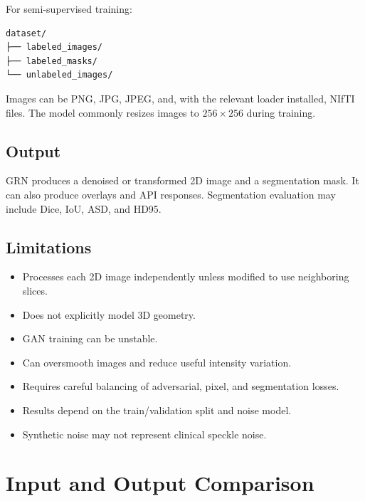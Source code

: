 \documentclass[11pt,a4paper]{article}
\begin{document}
For semi-supervised training:
\begin{verbatim}
dataset/
├── labeled_images/
├── labeled_masks/
└── unlabeled_images/
\end{verbatim}

Images can be PNG, JPG, JPEG, and, with the relevant loader installed, NIfTI files. The model commonly resizes images to $256\times256$ during training.

\subsection{Output}
GRN produces a denoised or transformed 2D image and a segmentation mask. It can also produce overlays and API responses. Segmentation evaluation may include Dice, IoU, ASD, and HD95.

\subsection{Limitations}
\begin{itemize}
    \item Processes each 2D image independently unless modified to use neighboring slices.
    \item Does not explicitly model 3D geometry.
    \item GAN training can be unstable.
    \item Can oversmooth images and reduce useful intensity variation.
    \item Requires careful balancing of adversarial, pixel, and segmentation losses.
    \item Results depend on the train/validation split and noise model.
    \item Synthetic noise may not represent clinical speckle noise.
\end{itemize}

\section{Input and Output Comparison}
\end{document}
